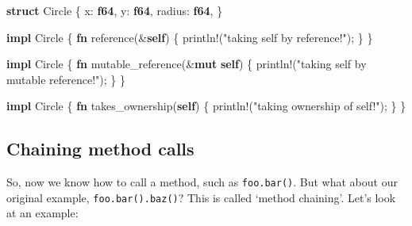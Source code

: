 \documentclass[a4paper,]{book}
\newenvironment{Shaded}{\begin{snugshade}}{\end{snugshade}}
\newcommand{\KeywordTok}[1]{\textcolor[rgb]{0.13,0.29,0.53}{\textbf{{#1}}}}
\newcommand{\StringTok}[1]{\textcolor[rgb]{0.31,0.60,0.02}{{#1}}}
\newcommand{\OtherTok}[1]{\textcolor[rgb]{0.56,0.35,0.01}{{#1}}}
\newcommand{\NormalTok}[1]{{#1}}
\begin{document}
\begin{Shaded}
\begin{Highlighting}[]
\KeywordTok{struct} \NormalTok{Circle \{}
    \NormalTok{x: }\KeywordTok{f64}\NormalTok{,}
    \NormalTok{y: }\KeywordTok{f64}\NormalTok{,}
    \NormalTok{radius: }\KeywordTok{f64}\NormalTok{,}
\NormalTok{\}}

\KeywordTok{impl} \NormalTok{Circle \{}
    \KeywordTok{fn} \NormalTok{reference(&}\KeywordTok{self}\NormalTok{) \{}
       \OtherTok{println!}\NormalTok{(}\StringTok{"taking self by reference!"}\NormalTok{);}
    \NormalTok{\}}
\NormalTok{\}}

\KeywordTok{impl} \NormalTok{Circle \{}
    \KeywordTok{fn} \NormalTok{mutable_reference(&}\KeywordTok{mut} \KeywordTok{self}\NormalTok{) \{}
       \OtherTok{println!}\NormalTok{(}\StringTok{"taking self by mutable reference!"}\NormalTok{);}
    \NormalTok{\}}
\NormalTok{\}}

\KeywordTok{impl} \NormalTok{Circle \{}
    \KeywordTok{fn} \NormalTok{takes_ownership(}\KeywordTok{self}\NormalTok{) \{}
       \OtherTok{println!}\NormalTok{(}\StringTok{"taking ownership of self!"}\NormalTok{);}
    \NormalTok{\}}
\NormalTok{\}}
\end{Highlighting}
\end{Shaded}

\subsection{Chaining method calls}\label{chaining-method-calls}

So, now we know how to call a method, such as \texttt{foo.bar()}. But
what about our original example, \texttt{foo.bar().baz()}? This is
called `method chaining'. Let's look at an example:
\end{document}
